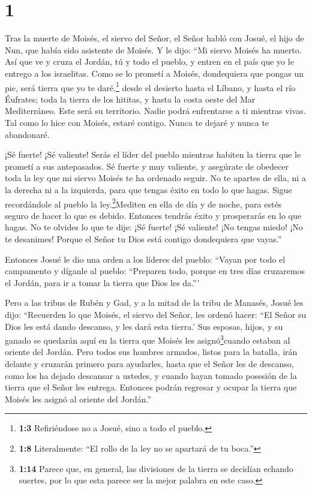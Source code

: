 \hypertarget{section}{%
\section{1}\label{section}}

 Tras la muerte de Moisés, el siervo del Señor, el Señor
habló con Josué, el hijo de Nun, que había sido asistente de Moisés. Y
le dijo:  ``Mi siervo Moisés ha muerto. Así que ve y cruza
el Jordán, tú y todo el pueblo, y entren en el país que yo le entrego a
los israelitas.  Como se lo prometí a Moisés, dondequiera
que pongas un pie, será tierra que yo te daré,\footnote{\textbf{1:3}
  Refiriéndose no a Josué, sino a todo el pueblo.}  desde el
desierto hasta el Líbano, y hasta el río Éufrates; toda la tierra de los
hititas, y hasta la costa oeste del Mar Mediterráneo. Este será su
territorio.  Nadie podrá enfrentarse a ti mientras vivas.
Tal como lo hice con Moisés, estaré contigo. Nunca te dejaré y nunca te
abandonaré.

 ¡Sé fuerte! ¡Sé valiente! Serás el líder del pueblo
mientras habiten la tierra que le prometí a sus antepasados.
 Sé fuerte y muy valiente, y asegúrate de obedecer toda la
ley que mi siervo Moisés te ha ordenado seguir. No te apartes de ella,
ni a la derecha ni a la izquierda, para que tengas éxito en todo lo que
hagas.  Sigue recordándole al pueblo la
ley.\footnote{\textbf{1:8} Literalmente: ``El rollo de la ley no se
  apartará de tu boca.''}Mediten en ella de día y de noche, para estés
seguro de hacer lo que es debido. Entonces tendrás éxito y prosperarás
en lo que hagas.  No te olvides lo que te dije: ¡Sé fuerte!
¡Sé valiente! ¡No tengas miedo! ¡No te desanimes! Porque el Señor tu
Dios está contigo dondequiera que vayas.''

 Entonces Josué le dio una orden a los líderes del pueblo:
 ``Vayan por todo el campamento y díganle al pueblo:
``Preparen todo, porque en tres días cruzaremos el Jordán, para ir a
tomar la tierra que Dios les da.'''

 Pero a las tribus de Rubén y Gad, y a la mitad de la tribu
de Manasés, Josué les dijo:  ``Recuerden lo que Moisés, el
siervo del Señor, les ordenó hacer: ``El Señor su Dios les está dando
descanso, y les dará esta tierra.'  Sus esposas, hijos, y
su ganado se quedarán aquí en la tierra que Moisés les
asignó\footnote{\textbf{1:14} Parece que, en general, las divisiones de
  la tierra se decidían echando suertes, por lo que esta parece ser la
  mejor palabra en este caso.}cuando estaban al oriente del Jordán. Pero
todos sus hombres armados, listos para la batalla, irán delante y
cruzarán primero para ayudarles,  hasta que el Señor les de
descanso, como los ha dejado descansar a ustedes, y cuando hayan tomado
posesión de la tierra que el Señor les entrega. Entonces podrán regresar
y ocupar la tierra que Moisés les asignó al oriente del Jordán.''

